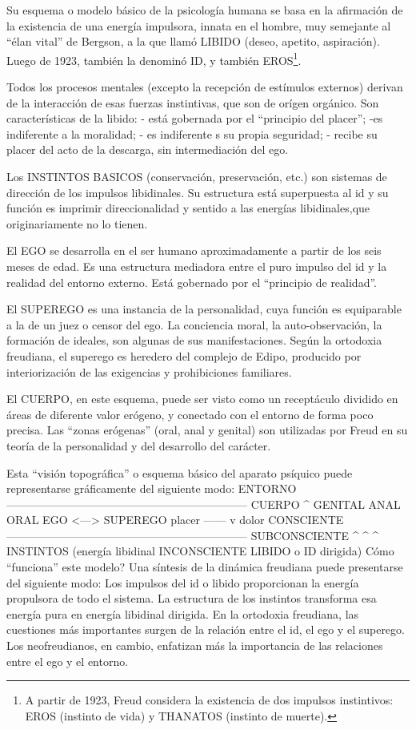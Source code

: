 \documentclass[
]{book}
\begin{document}
Su esquema o modelo básico de la psicología humana se basa en la afirmación de la existencia de una energía impulsora, innata en el hombre, muy semejante al ``élan vital'' de Bergson, a la que llamó LIBIDO (deseo, apetito, aspiración). Luego de 1923, también la denominó ID, y también EROS\footnote{A partir de 1923, Freud considera la existencia de dos impulsos instintivos: EROS (instinto de vida) y THANATOS (instinto de muerte).}.

Todos los procesos mentales (excepto la recepción de estímulos externos) derivan de la interacción de esas fuerzas instintivas, que son de orígen orgánico. Son características de la libido: - está gobernada por el ``principio del placer''; -es indiferente a la moralidad; - es indiferente s su propia seguridad; - recibe su placer del acto de la descarga, sin intermediación del ego.

Los INSTINTOS BASICOS (conservación, preservación, etc.) son sistemas de dirección de los impulsos libidinales. Su estructura está superpuesta al id y su función es imprimir direccionalidad y sentido a las energías libidinales,que originariamente no lo tienen.

El EGO se desarrolla en el ser humano aproximadamente a partir de los seis meses de edad. Es una estructura mediadora entre el puro impulso del id y la realidad del entorno externo. Está gobernado por el ``principio de realidad''.

El SUPEREGO es una instancia de la personalidad, cuya función es equiparable a la de un juez o censor del ego. La conciencia moral, la auto-observación, la formación de ideales, son algunas de sus manifestaciones. Según la ortodoxia freudiana, el superego es heredero del complejo de Edipo, producido por interiorización de las exigencias y prohibiciones familiares.

El CUERPO, en este esquema, puede ser visto como un receptáculo dividido en áreas de diferente valor erógeno, y conectado con el entorno de forma poco precisa. Las ``zonas erógenas'' (oral, anal y genital) son utilizadas por Freud en su teoría de la personalidad y del desarrollo del carácter.

Esta ``visión topográfica'' o esquema básico del aparato psíquico puede representarse gráficamente del siguiente modo: ENTORNO ----------------------------------------------------------------- CUERPO \^{} GENITAL ANAL ORAL \textbar{} EGO \textless---\textgreater{} SUPEREGO placer \textbar{} ------ v dolor CONSCIENTE ----------------------------------------------------------------- SUBCONSCIENTE \^{} \^{} \^{} INSTINTOS \textbar{} \textbar{} \textbar{} (energía libidinal INCONSCIENTE LIBIDO o ID dirigida) Cómo ``funciona'' este modelo? Una síntesis de la dinámica freudiana puede presentarse del siguiente modo: Los impulsos del id o libido proporcionan la energía propulsora de todo el sistema. La estructura de los instintos transforma esa energía pura en energía libidinal dirigida. En la ortodoxia freudiana, las cuestiones más importantes surgen de la relación entre el id, el ego y el superego. Los neofreudianos, en cambio, enfatizan más la importancia de las relaciones entre el ego y el entorno.
\end{document}
